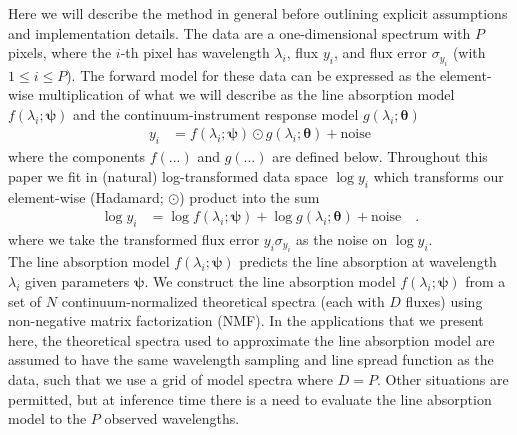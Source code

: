 \documentclass[modern]{aastex631}
\newcommand{\vectheta}{\boldsymbol{\theta}}
\newcommand{\vecpsi}{\boldsymbol{\psi}}
\newcommand{\hadamard}{\odot}
\begin{document}
Here we will describe the method in general before outlining explicit assumptions and implementation details. The data are a one-dimensional spectrum with $P$ pixels, where the $i$-th pixel has wavelength $\lambda_i$, flux $y_i$, and flux error $\sigma_{y_i}$ (with $1 \leq i \leq P$). The forward model for these data can be expressed as the element-wise multiplication of what we will describe as the line absorption model $f(\lambda_i; \vecpsi)$ and the continuum-instrument response model $g(\lambda_i;\vectheta)$
\begin{align}
    y_i &= f(\lambda_i;\vecpsi)\hadamard{}g(\lambda_i;\vectheta) + \mbox{noise}
\end{align}
where the components $f(...)$ and $g(...)$ are defined below. Throughout this paper we fit in (natural) log-transformed data space $\log{y_i}$ which transforms our element-wise (Hadamard; $\hadamard$) product into the sum
\begin{align}
    \label{eq:log_y}
    \log{y_i} &= \log{f(\lambda_i; \vecpsi)} + \log{g(\lambda_i;\vectheta)} + \mbox{noise} \quad .
\end{align}
where we take the transformed flux error $y_i\sigma_{y_i}$ as the noise on $\log{y_i}$.\\


The line absorption model $f(\lambda_i;\vecpsi)$ predicts the line absorption at wavelength $\lambda_i$ given parameters $\vecpsi$. We construct the line absorption model $f(\lambda_i;\vecpsi)$ from a set of $N$ continuum-normalized theoretical spectra (each with $D$ fluxes) using non-negative matrix factorization (NMF). In the applications that we present here, the theoretical spectra used to approximate the line absorption model are assumed to have the same wavelength sampling and line spread function as the data, such that we use a grid of model spectra where $D = P$. Other situations are permitted, but at inference time there is a need to evaluate the line absorption model to the $P$ observed wavelengths.\\
\end{document}
